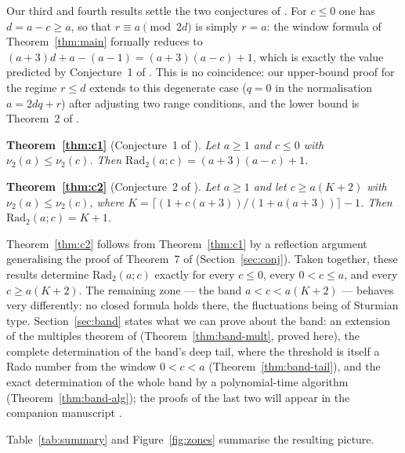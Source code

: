 \documentclass[11pt]{article}
\theoremstyle{remark}
\theoremstyle{definition}
\newcommand{\Rad}{\mathrm{Rad}_2}
\newcommand{\vtwo}{\nu_2}
\begin{document}
Our third and fourth results settle the two conjectures of \cite{DT2020}.
For $c \le 0$ one has $d = a - c \ge a$, so that $r \equiv a \pmod{2d}$ is
simply $r = a$: the window formula of Theorem~\ref{thm:main} formally
reduces to $(a+3)d + a - (a-1) = (a+3)(a-c) + 1$, which is exactly the value
predicted by Conjecture~1 of \cite{DT2020}. This is no coincidence: our
upper-bound proof for the regime $r \le d$ extends to this degenerate case
($q = 0$ in the normalisation $a = 2dq + r$) after adjusting two range
conditions, and the lower bound is Theorem~2 of \cite{DT2020}.

\medskip
\noindent\textbf{Theorem~\ref{thm:c1}} (Conjecture~1 of \cite{DT2020}).
\emph{Let $a \ge 1$ and $c \le 0$ with $\vtwo(a) \le \vtwo(c)$. Then
$\Rad(a;c) = (a+3)(a-c) + 1$.}

\medskip
\noindent\textbf{Theorem~\ref{thm:c2}} (Conjecture~2 of \cite{DT2020}).
\emph{Let $a \ge 1$ and let $c \ge a(K+2)$ with $\vtwo(a) \le \vtwo(c)$, where
$K = \bigl\lceil (1 + c(a+3)) / (1 + a(a+3)) \bigr\rceil - 1$. Then
$\Rad(a;c) = K + 1$.}

\medskip
Theorem~\ref{thm:c2} follows from Theorem~\ref{thm:c1} by a
reflection argument generalising the proof of Theorem~7 of \cite{DT2020}
(Section~\ref{sec:conj}). Taken together, these results determine
$\Rad(a;c)$ exactly for every $c \le 0$, every $0 < c \le a$, and every
$c \ge a(K+2)$. The remaining zone --- the band $a < c < a(K+2)$ --- behaves
very differently: no closed formula holds there, the fluctuations being of
Sturmian type. Section~\ref{sec:band} states what we can prove about the
band: an extension of the multiples theorem of \cite{DT2020}
(Theorem~\ref{thm:band-mult}, proved here), the complete determination of
the band's deep tail, where the threshold is itself a Rado number from the
window $0 < c < a$ (Theorem~\ref{thm:band-tail}), and the exact
determination of the whole band by a polynomial-time algorithm
(Theorem~\ref{thm:band-alg}); the proofs of the last two will appear in the
companion manuscript \cite{companion}.

Table~\ref{tab:summary} and Figure~\ref{fig:zones} summarise the resulting
picture.
\end{document}
